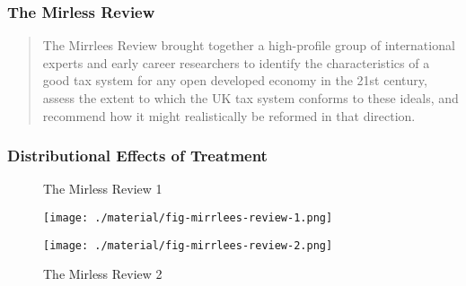     
\begin{frame}
\frametitle{The Mirless Review}

\begin{quote}
The Mirrlees Review brought together a high-profile group of
international experts and early career researchers to identify the
characteristics of a good tax system for any open developed economy in
the 21st century, assess the extent to which the UK tax system conforms
to these ideals, and recommend how it might realistically be reformed in
that direction.
\end{quote}
\end{frame}

\begin{frame}
\frametitle{Distributional Effects of Treatment}
\begin{figure}
\centering
\begin{minipage}{0.4\textwidth}
  \centering
  \caption{The Mirless Review 1}\label{The Mirless Review 1}
  \texttt{[image: ./material/fig-mirrlees-review-1.png]}
\end{minipage}%
\hfill
\begin{minipage}{0.4\textwidth}
  \centering
   \caption{The Mirless Review 2}\label{The Mirless Review 2}
   \texttt{[image: ./material/fig-mirrlees-review-2.png]}
\end{minipage}
\end{figure}
\end{frame}

  

    

    

   
